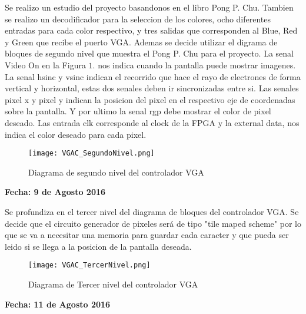 \documentclass[12pt,a4paper]{report}
\begin{document}
Se realizo un estudio del proyecto basandonos en el libro Pong P. Chu.
Tambien se realizo un decodificador para la seleccion de los colores, ocho diferentes entradas para cada color respectivo, y tres salidas que corresponden al Blue, Red y Green que recibe el puerto VGA. Ademas se decide utilizar el digrama de bloques de segundo nivel que muestra el Pong P. Chu para el proyecto.
La senal Video On en la Figura $1$. nos indica cuando la pantalla puede mostrar imagenes. La senal hsinc y vsinc indican el recorrido que hace el rayo de electrones de forma vertical y horizontal, estas dos senales deben ir sincronizadas entre si. Las senales pixel x y pixel y indican la posicion del pixel en el respectivo eje de coordenadas sobre la pantalla. Y por ultimo la senal rgp debe mostrar el color de pixel deseado. Las entrada clk corresponde al clock de la FPGA y la external data, nos indica el color deseado para cada pixel.
\begin{figure}[htbp]
  \centering
    \texttt{[image: VGAC\_SegundoNivel.png]}
  \caption[1erNivel]{Diagrama de segundo nivel del controlador VGA}
  \label{fig:VGAC_2doNivel}
\end{figure}

\begin{flushright}
\begin{large}
\textbf{Fecha: 9 de Agosto 2016}\\
\end{large}
\end{flushright}

Se profundiza en el tercer nivel del diagrama de bloques del controlador VGA. Se decide que el circuito generador de pixeles será de tipo "tile maped scheme" por lo que se va a necesitar una memoria para guardar cada caracter y que pueda ser leido si se llega a la posicion de la pantalla deseada.

\begin{figure}[htbp]
  \centering
    \texttt{[image: VGAC\_TercerNivel.png]}
  \caption[1erNivel]{Diagrama de Tercer nivel del controlador VGA}
  \label{fig:VGAC_3erNivel}
\end{figure}

\begin{flushright}
\begin{large}
\textbf{Fecha: 11 de Agosto 2016}\\
\end{large}
\end{flushright}
\end{document}

